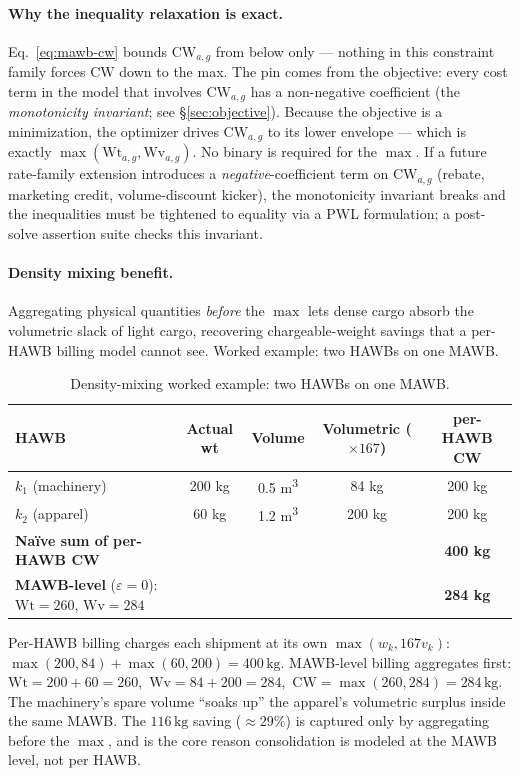 \documentclass[11pt,a4paper]{article}
\theoremstyle{definition}
\begin{document}
\paragraph{Why the inequality relaxation is exact.}
Eq.~\ref{eq:mawb-cw} bounds $\text{CW}_{a,g}$ from below only --- nothing in
this constraint family forces $\text{CW}$ down to the max. The pin comes
from the objective: every cost term in the model that involves
$\text{CW}_{a,g}$ has a non-negative coefficient (the \emph{monotonicity
invariant}; see \S\ref{sec:objective}). Because the objective is a
minimization, the optimizer drives $\text{CW}_{a,g}$ to its lower envelope
--- which is exactly $\max(\text{Wt}_{a,g}, \text{Wv}_{a,g})$. No binary is
required for the $\max$. If a future rate-family extension introduces a
\emph{negative}-coefficient term on $\text{CW}_{a,g}$ (rebate, marketing
credit, volume-discount kicker), the monotonicity invariant breaks and the
inequalities must be tightened to equality via a PWL formulation; a
post-solve assertion suite checks this invariant.

\paragraph{Density mixing benefit.}
Aggregating physical quantities \emph{before} the $\max$ lets dense cargo
absorb the volumetric slack of light cargo, recovering chargeable-weight
savings that a per-HAWB billing model cannot see. Worked example: two HAWBs
on one MAWB.
\begin{table}[H]
\centering
\caption{Density-mixing worked example: two HAWBs on one MAWB.}
\label{tab:density-mixing-example}
\begin{tabular}{lcccc}
\toprule
HAWB & Actual wt & Volume & Volumetric ($\times 167$) & per-HAWB CW \\
\midrule
$k_1$ (machinery) & 200 kg & 0.5 m\textsuperscript{3} & 84 kg & 200 kg \\
$k_2$ (apparel)   & 60 kg  & 1.2 m\textsuperscript{3} & 200 kg & 200 kg \\
\midrule
\textbf{Naïve sum of per-HAWB CW} & & & & \textbf{400 kg} \\
\textbf{MAWB-level} ($\varepsilon = 0$): $\text{Wt} = 260$, $\text{Wv} = 284$ & & & & \textbf{284 kg} \\
\bottomrule
\end{tabular}
\end{table}
Per-HAWB billing charges each shipment at its own $\max(w_k, 167 v_k)$:
$\max(200, 84) + \max(60, 200) = 400\,\text{kg}$. MAWB-level billing
aggregates first: $\text{Wt} = 200 + 60 = 260$,\, $\text{Wv} = 84 + 200 =
284$,\, $\text{CW} = \max(260, 284) = 284\,\text{kg}$. The machinery's
spare volume ``soaks up'' the apparel's volumetric surplus inside the same
MAWB. The $116\,\text{kg}$ saving ($\approx 29\%$) is captured only by
aggregating before the $\max$, and is the core reason consolidation is
modeled at the MAWB level, not per HAWB.
\end{document}
